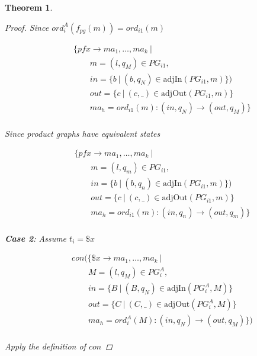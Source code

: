 \documentclass[twocolumn]{sig-alternate-10pt}
\newtheorem{thm}{Theorem}[section]
\begin{document}
\begin{thm}
\begin{proof}
  Since $ord^A_i(f_{pg}(m)) = ord_{i1}(m)$

  \[ \begin{array}{l}
     ~~~~~~~~~ \{ pfx \rightarrow ma_1, \dots, ma_k ~\vert~ \\
     ~~~~~~~~~~~~~~~~~~ m = (l,q_M) \in PG_{i1}, \\
     ~~~~~~~~~~~~~~~~~~ in = \{ b ~\vert~ (b,q_N) \in \text{adjIn}(PG_{i1},m) \}) \\
     ~~~~~~~~~~~~~~~~~~ out = \{ c ~\vert~ (c,\_) \in \text{adjOut}(PG_{i1},m) \} \\
     ~~~~~~~~~~~~~~~~~~ ma_h = ord_{i1}(m) : (in,q_N) \rightarrow (out,q_M) \} \\
  \end{array} \]%

  Since product graphs have equivalent states

  \[ \begin{array}{l}
     ~~~~~~~~~ \{ pfx \rightarrow ma_1, \dots, ma_k ~\vert~ \\
     ~~~~~~~~~~~~~~~~~~ m = (l,q_m) \in PG_{i1}, \\
     ~~~~~~~~~~~~~~~~~~ in = \{ b ~\vert~ (b,q_n) \in \text{adjIn}(PG_{i1},m) \}) \\
     ~~~~~~~~~~~~~~~~~~ out = \{ c ~\vert~ (c,\_) \in \text{adjOut}(PG_{i1},m) \} \\
     ~~~~~~~~~~~~~~~~~~ ma_h = ord_{i1}(m) : (in,q_n) \rightarrow (out,q_m) \} \\
  \end{array} \]%

  \vspace{1em}
  \textbf{Case 2}: Assume $t_i = \$x$

  \[ \begin{array}{l}
     ~~~~~~~~~ con(\{ \$x \rightarrow ma_1, \dots, ma_k ~\vert~ \\
     ~~~~~~~~~~~~~~~~~~ M = (l,q_M) \in PG^A_i, \\
     ~~~~~~~~~~~~~~~~~~ in = \{ B ~\vert~ (B,q_N) \in \text{adjIn}(PG^A_i,M) \} \\
     ~~~~~~~~~~~~~~~~~~ out = \{ C ~\vert~ (C,\_) \in \text{adjOut}(PG^A_i,M) \} \\
     ~~~~~~~~~~~~~~~~~~ ma_h = ord^A_i(M) : (in,q_N) \rightarrow (out,q_M) \}) \\
  \end{array} \]%

  Apply the definition of $con$


\end{proof}
\end{thm}
\end{document}
